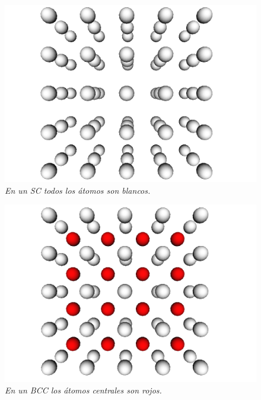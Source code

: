 \begin{figure}[ht]
  \centering
  \includegraphics[scale=.3]{images/atomCanvas-SC}
  \caption{\em En un SC todos los átomos son blancos.}
  \label{atomCanvas-SC}
\end{figure}

\begin{figure}[ht]
  \centering
  \includegraphics[scale=.3]{images/atomCanvas-BCC}
  \caption{\em En un BCC los átomos centrales son rojos.}
  \label{atomCanvas-BCC}
\end{figure}


